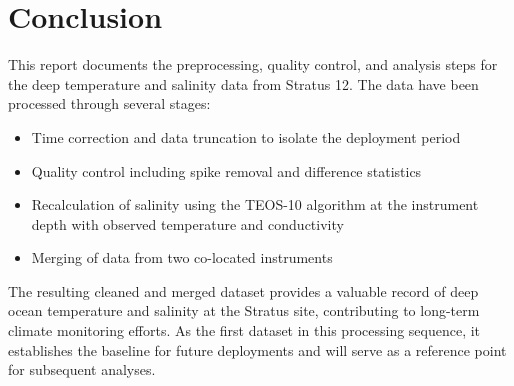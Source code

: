 \documentclass[11pt]{article}
\newcommand{\projectname}{Stratus}  %
\newcommand{\casenumber}{12}  %
\begin{document}
\section{Conclusion}
This report documents the preprocessing, quality control, and analysis steps 
for the deep temperature and salinity data from \projectname{} \casenumber{}. 
The data have been processed through several stages:

\begin{itemize}
    \item Time correction and data truncation to isolate the deployment period
    \item Quality control including spike removal and difference statistics
    \item Recalculation of salinity using the TEOS-10 algorithm at the instrument depth with observed temperature and conductivity
    \item Merging of data from two co-located instruments
\end{itemize}

The resulting cleaned and merged dataset provides a valuable record of deep ocean temperature and salinity 
at the \projectname{} site, contributing to long-term climate monitoring efforts. As the first dataset in this 
processing sequence, it establishes the baseline for future deployments and will serve as a reference point for 
subsequent analyses.
\end{document}
